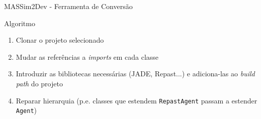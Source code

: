 \begin{frame}{MASSim2Dev - Ferramenta de Conversão}

	Algoritmo
	\begin{samepage}
		\begin{enumerate}
		  \item Clonar o projeto selecionado
		  \item Mudar as referências a \emph{imports} em cada classe
		  \item Introduzir as bibliotecas necessárias (JADE, Repast...) e adiciona-las ao \emph{build path} do projeto
		  \item Reparar hierarquia (p.e. classes que estendem \texttt{RepastAgent} passam a estender \texttt{Agent})
		\end{enumerate}
	\end{samepage}
\end{frame}

